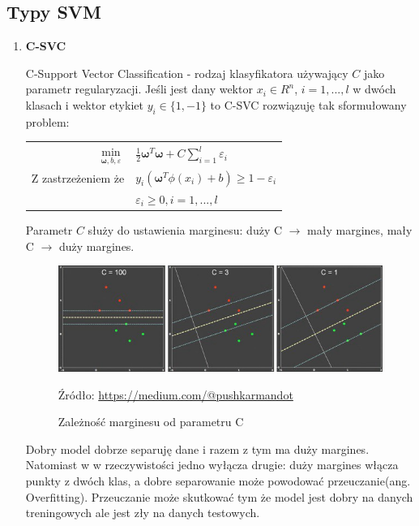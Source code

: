 \documentclass[paper=a4, fontsize=11pt]{scrartcl} %
\numberwithin{equation}{section} %
\numberwithin{figure}{section} %
\newcommand*{\captionsource}[2]{%
  \caption[{#1}]{%
      #1}
    Źródło: #2%
}
\begin{document}
\subsection{Typy SVM}
\begin{enumerate}
    \item \textbf{C-SVC}
    \par C-Support Vector Classification - rodzaj klasyfikatora używający $C$ jako 
    parametr regularyzacji. Jeśli jest dany wektor $x_i \in R^n$, $i=1,...,l$ 
    w dwóch klasach i wektor etykiet $y_i \in \{1, -1\}$ to C-SVC rozwiązuję tak
    sformułowany problem:

    \begin{center}
        \begin{tabular}{rl}
            $\min\limits_{\pmb{\omega}, b, \varepsilon}$ & $\frac{1}{2} \pmb{\omega} ^T \pmb{\omega} +
            C \sum\limits_{i=1}^{l}\varepsilon_i$ \\
            Z zastrzeżeniem że & $y_i(\pmb{\omega}^T\phi(x_i) + b) \geq 1 - \varepsilon_i$ \\
                               & $\varepsilon_i \geq 0,i=1,...,l$
        \end{tabular}
    \end{center}

    \par Parametr $C$ służy do ustawienia marginesu: duży C $\rightarrow$ mały margines,
    mały C $\rightarrow$ duży margines.

    \begin{figure}[H]
        \begin{center}
            \includegraphics[scale=0.8]{./img/param_c.png}
            \captionsource{Zależność marginesu od parametru C}{\url{https://medium.com/@pushkarmandot}}
            \label{fig:param_c}
        \end{center}
    \end{figure}

    \par Dobry model dobrze separuję dane i razem z tym ma duży margines. Natomiast w
    w rzeczywistości jedno wyłącza drugie: duży margines włącza punkty z dwóch klas, a
    dobre separowanie może powodować przeuczanie(ang. Overfitting). Przeuczanie może 
    skutkować tym że model jest dobry na danych treningowych ale jest zły na danych testowych.


\end{enumerate}
\end{document}
